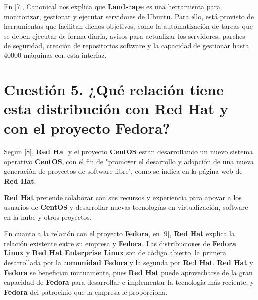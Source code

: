 En [7], Canonical nos explica que \textbf{Landscape} es una herramienta para monitorizar, gestionar y ejecutar servidores de Ubuntu.
Para ello, está provisto de herramientas que facilitan dichos objetivos, como la automatización de tareas que se deben ejecutar de forma diaria, avisos para actualizar los servidores, parches de seguridad, creación de repositorios software y la capacidad de gestionar hasta 40000 máquinas con esta interfaz.



\section{Cuestión 5. ¿Qué relación tiene esta distribución con Red Hat y con el
proyecto Fedora?}

Según [8], \textbf{Red Hat} y el proyecto \textbf{CentOS} están desarrollando un nuevo sistema operativo \textbf{CentOS}, con el fin de "promover el desarrollo y adopción de una nueva generación de proyectos de software libre", como se indica en la página web de \textbf{Red Hat}.

\textbf{Red Hat} pretende colaborar con sus recursos y experiencia para apoyar a los usuarios de \textbf{CentOS} y desarrollar nuevas tecnologías en virtualización, software en la nube y otros proyectos.

En cuanto a la relación con el proyecto \textbf{Fedora}, en [9], \textbf{Red Hat} explica la relación existente entre su empresa y \textbf{Fedora}.
Las distribuciones de \textbf{Fedora Linux} y \textbf{Red Hat Enterprise Linux} son de código abierto, la primera desarrollada por la \textbf{comunidad Fedora} y la segunda por \textbf{Red Hat}.
\textbf{Red Hat} y \textbf{Fedora} se benefician mutuamente, pues \textbf{Red Hat} puede aprovecharse de la gran capacidad de \textbf{Fedora} para desarrollar e implementar la tecnología más reciente, y \textbf{Fedora} del patrocinio que la empresa le proporciona.



